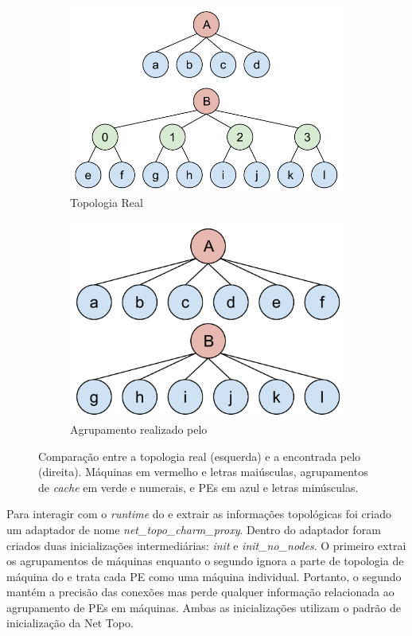 \begin{figure}[h]
\begin{subfigure}{.55\textwidth}
    \centering
    \includegraphics[width=0.85\linewidth]{images/init_real_topo.pdf}
    \caption{Topologia Real}
    \label{fig:charm_imprecision:real}
\end{subfigure}
\begin{subfigure}{.45\textwidth}
    \centering
    \includegraphics[width=0.8\linewidth]{images/init_charm_topo.pdf}
    \caption{Agrupamento realizado pelo \charm}
    \label{fig:charm_imprecision:charm}
\end{subfigure}
\caption[Comparação entre a topologia real e a encontrada pelo \charm.]{Comparação entre a topologia real (esquerda) e a encontrada pelo \charm (direita). Máquinas em vermelho e letras maiúsculas, agrupamentos de \textit{cache} em verde e numerais, e PEs em azul e letras minúsculas.}
\label{fig:charm_imprecision}
\end{figure}

Para interagir com o \textit{runtime} do \charm e extrair as informações topológicas foi criado um adaptador de nome \textit{net\_topo\_charm\_proxy}.
Dentro do adaptador foram criados duas inicializações intermediárias: \textit{init} e \textit{init\_no\_nodes}.
O primeiro extrai os agrupamentos de máquinas enquanto o segundo ignora a parte de topologia de máquina do \charm e trata cada PE como uma máquina individual.
Portanto, o segundo mantém a precisão das conexões mas perde qualquer informação relacionada ao agrupamento de PEs em máquinas.
Ambas as inicializações utilizam o padrão de inicialização da Net Topo.




